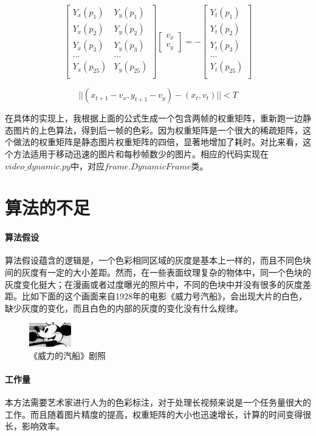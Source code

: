 \documentclass{article}
\begin{document}
\begin{equation}
\left[
\begin{array}{cc}
Y_x(p_1) & Y_y(p_1)\\
Y_x(p_2) & Y_y(p_2)\\
Y_x(p_3) & Y_y(p_3)\\
\ldots & \ldots \\
Y_x(p_{25}) & Y_y(p_{25})\\
\end{array}
\right]
\left[
\begin{array}{c}
v_x\\
v_y
\end{array}
\right]
= - 
\left[
\begin{array}{c}
Y_t(p_1)\\
Y_t(p_2)\\
Y_t(p_3)\\
\ldots\\
Y_t(p_{25})\\
\end{array}
\right]
\end{equation}

\begin{equation}
||(x_{t+1}-v_x, y_{t+1}-v_y) - (x_t, v_t)||< T
\end{equation}

在具体的实现上，我根据上面的公式生成一个包含两帧的权重矩阵，重新跑一边静态图片的上色算法，得到后一帧的色彩。因为权重矩阵是一个很大的稀疏矩阵，这个做法的权重矩阵是静态图片权重矩阵的四倍，显著地增加了耗时。对比来看，这个方法适用于移动迅速的图片和每秒帧数少的图片。相应的代码实现在$video\_dynamic.py$中，对应$frame.DynamicFrame$类。

\section{算法的不足}

\paragraph{算法假设}算法假设蕴含的逻辑是，一个色彩相同区域的灰度是基本上一样的，而且不同色块间的灰度有一定的大小差距。然而，在一些表面纹理复杂的物体中，同一个色块的灰度变化挺大；在漫画或者过度曝光的照片中，不同的色块中并没有很多的灰度差距。比如下面的这个画面来自1928年的电影《威力号汽船》，会出现大片的白色，缺少灰度的变化，而且白色的内部的灰度的变化没有什么规律。
\begin{figure}[H]
\centering
\includegraphics[scale=2]{gray_9.jpeg}
\caption{《威力的汽船》剧照}
\end{figure}

\paragraph{工作量}本方法需要艺术家进行人为的色彩标注，对于处理长视频来说是一个任务量很大的工作。而且随着图片精度的提高，权重矩阵的大小也迅速增长，计算的时间变得很长，影响效率。


\paragraph{}
\end{document}

